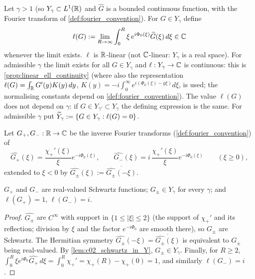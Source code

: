 \begin{definition}
  \label{def:ell}
  Let $\gamma>1$ (so $Y_\gamma\subset L^1(\mathbb{R})$ and $\widehat G$ is a bounded continuous function, with the
  Fourier transform of \cref{def:fourier_convention}). For $G\in Y_\gamma$ define
  \[
    \ell(G):=\lim_{R\to\infty}\int_0^R\xi\,e^{i\Phi_0(\xi)}\widehat G(\xi)\,d\xi\in\mathbb{C}
  \]
  whenever the limit exists. $\ell$ is $\mathbb{R}$-linear (not $\mathbb{C}$-linear: $Y_\gamma$ is a real space).
  For admissible $\gamma$ the limit exists for all $G\in Y_\gamma$ and $\ell:Y_\gamma\to\mathbb{C}$ is
  continuous: this is \cref{prop:linear_ell_continuity} (where also the representation
  $\ell(G)=\int_{\mathbb{R}} G'(y)K(y)\,dy$, $K(y)=-i\int_0^\infty e^{i(\Phi_0(\xi)-y\xi)}d\xi$, is used; the
  normalising constants depend on \cref{def:fourier_convention}).
  The value $\ell(G)$ does not depend on $\gamma$: if $G\in Y_{\gamma'}\subset Y_\gamma$ the
  defining expression is the same.
  For admissible $\gamma$ put $\widetilde{Y}_\gamma:=\{G\in Y_\gamma:\ell(G)=0\}$.
\end{definition}

\begin{definition}
  \label{def:G_pm}
  Let $G_+,G_-:\mathbb{R}\to\mathbb{C}$ be the inverse Fourier transforms (\cref{def:fourier_convention}) of
  \[
    \widehat{G_+}(\xi)=\frac{\chi_+'(\xi)}{\xi}e^{-i\Phi_0(\xi)},\qquad
    \widehat{G_-}(\xi)=i\,\frac{\chi_+'(\xi)}{\xi}e^{-i\Phi_0(\xi)}\qquad(\xi\ge0),
  \]
  extended to $\xi<0$ by $\widehat{G_\pm}(\xi):=\overline{\widehat{G_\pm}(-\xi)}$.
\end{definition}

\begin{lemma}[Properties of $G_\pm$]
  \label{lem:c02_G_pm_properties}
  $G_+$ and $G_-$ are real-valued Schwartz functions; $G_\pm\in Y_\gamma$ for every $\gamma$; and
  $\ell(G_+)=1$, $\ell(G_-)=i$.
\end{lemma}
\begin{proof}
  $\widehat{G_\pm}$ are $C^\infty$ with support in $\{1\le|\xi|\le2\}$ (the support of $\chi_+'$ and its
  reflection; division by $\xi$ and the factor $e^{-i\Phi_0}$ are smooth there), so $G_\pm$ are
  Schwartz. The Hermitian symmetry $\widehat{G_\pm}(-\xi)=\overline{\widehat{G_\pm}(\xi)}$ is equivalent to
  $G_\pm$ being real-valued. By \cref{lem:c02_schwartz_in_Y}, $G_\pm\in Y_\gamma$. Finally, for $R\ge2$,
  $\int_0^R\xi e^{i\Phi_0}\widehat{G_+}\,d\xi=\int_0^R\chi_+'=\chi_+(R)-\chi_+(0)=1$, and similarly
  $\ell(G_-)=i$.
\end{proof}

